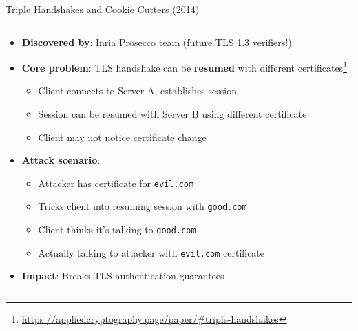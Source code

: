 \documentclass[aspectratio=169, lualatex, handout]{beamer}
\begin{document}
\begin{frame}{Triple Handshakes and Cookie Cutters (2014)}
	\begin{columns}[c]
		\begin{column}{1\textwidth}
			\begin{itemize}[<+->]
				\item \textbf{Discovered by}: Inria Prosecco team (future TLS 1.3 verifiers!)
				\item \textbf{Core problem}: TLS handshake can be \textbf{resumed} with different certificates\footnote{\url{https://appliedcryptography.page/paper/\#triple-handshakes}}
				      \begin{itemize}
					      \item Client connects to Server A, establishes session
					      \item Session can be resumed with Server B using different certificate
					      \item Client may not notice certificate change
				      \end{itemize}
				\item \textbf{Attack scenario}:
				      \begin{itemize}
					      \item Attacker has certificate for \texttt{evil.com}
					      \item Tricks client into resuming session with \texttt{good.com}
					      \item Client thinks it's talking to \texttt{good.com}
					      \item Actually talking to attacker with \texttt{evil.com} certificate
				      \end{itemize}
				\item \textbf{Impact}: Breaks TLS authentication guarantees
			\end{itemize}
		\end{column}
	\end{columns}
\end{frame}
\end{document}
